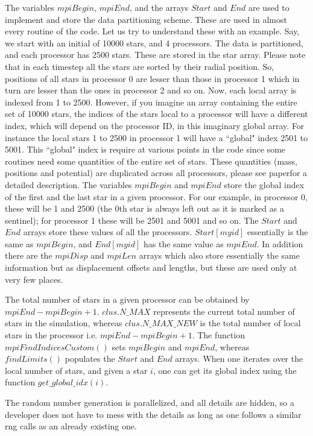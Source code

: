 \documentclass[11pt]{article}
\begin{document}
The variables $mpiBegin$, $mpiEnd$, and the arrays $Start$ and $End$ are used to implement and store the data partitioning scheme. These are used in almost every routine of the code. Let us try to understand these with an example. Say, we start with an initial of 10000 stars, and 4 processors. The data is partitioned, and each processor has 2500 stars. These are stored in the star array. Please note that in each timestep all the stars are sorted by their radial position. So, positions of all stars in processor 0 are lesser than those in processor 1 which in turn are lesser than the ones in processor 2 and so on. Now, each local array is indexed from 1 to 2500. However, if you imagine an array containing the entire set of 10000 stars, the indices of the stars local to a processor will have a different index, which will depend on the processor ID, in this imaginary global array. For instance the local stars 1 to 2500 in processor 1 will have a ``global" index 2501 to 5001. This ``global" index is require at various points in the code since some routines need some quantities of the entire set of stars. These quantities (mass, positions and potential) are duplicated across all processors, please see paper\footnotemark[\value{footnote}] for a detailed description. The variables $mpiBegin$ and $mpiEnd$ store the global index of the first and the last star in a given processor. For our example, in processor 0, these will be 1 and 2500 (the 0th star is always left out as it is marked as a sentinel); for processor 1 these will be 2501 and 5001 and so on. The $Start$ and $End$ arrays store these values of all the processors. $Start[myid]$ essentially is the same as $mpiBegin$, and $End[myid]$ has the same value as $mpiEnd$. In addition there are the $mpiDisp$ and $mpiLen$ arrays which also store essentially the same information but as displacement offsets and lengths, but these are used only at very few places.

The total number of stars in a given processor can be obtained by $mpiEnd-mpiBegin+1$. $clus.N\_MAX$ represents the current total number of stars in the simulation, whereas $clus.N\_MAX\_NEW$ is the total number of local stars in the processor i.e. $mpiEnd-mpiBegin+1$. The function $mpiFindIndicesCustom()$ sets $mpiBegin$ and $mpiEnd$, whereas $findLimits()$ populates the $Start$ and $End$ arrays. When one iterates over the local number of stars, and given a star $i$, one can get its global index using the function $get\_global\_idx(i)$.

The random number generation is parallelized, and all details are hidden, so a developer does not have to mess with the details as long as one follows a similar rng calls as an already existing one.
\end{document}
